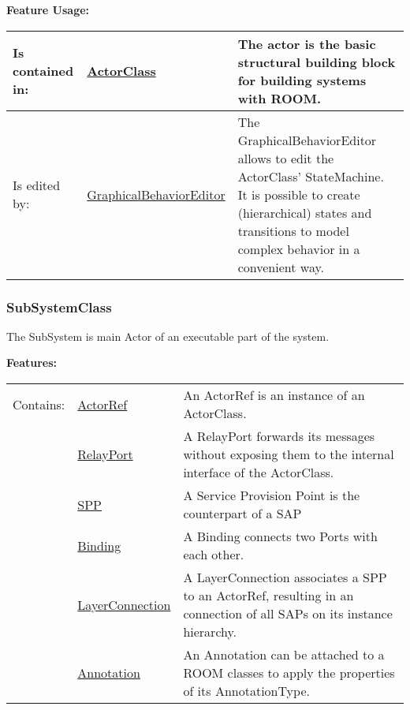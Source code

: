 	\begingroup
	\textbf{Feature Usage:}
	\renewcommand{\arraystretch}{1.8} %
	\begin{longtable}{l|l p{}}
		\hline
	Is contained in: & \tabitem \hyperlink{ref:ActorClass}{ActorClass}  & The actor is the basic structural building block for building systems with ROOM.\\
	\hline
	Is edited by: & \tabitem \hyperlink{ref:GraphicalBehaviorEditor}{GraphicalBehaviorEditor}  & The GraphicalBehaviorEditor allows to edit the ActorClass' StateMachine. It is possible to create (hierarchical) states and transitions to model complex behavior in a convenient way.\\
	\hline
	\end{longtable}
	\endgroup
		
	
	\vspace{\baselineskip}
	\vspace{\baselineskip}
	\vspace{\baselineskip}
	
\subsubsection{SubSystemClass}
	\hypertarget{ref:SubSystemClass}{}
	The SubSystem is main Actor of an executable part of the system. 
		
	
		
		
	\begingroup
	\textbf{Features:}
	\renewcommand{\arraystretch}{1.8} %
	\begin{longtable}{l|l p{}}
		\hline
	Contains: & \tabitem \hyperlink{ref:ActorRef}{ActorRef}  & An ActorRef is an instance of an ActorClass.\\
	& \tabitem \hyperlink{ref:RelayPort}{RelayPort}  & A RelayPort forwards its messages without exposing them to the internal interface of the ActorClass. \\
	& \tabitem \hyperlink{ref:SPP}{SPP}  & A Service Provision Point is the counterpart of a SAP \\
	& \tabitem \hyperlink{ref:Binding}{Binding}  & A Binding connects two Ports with each other. \\
	& \tabitem \hyperlink{ref:LayerConnection}{LayerConnection}  & A LayerConnection associates a SPP to an ActorRef, resulting in an connection of all SAPs on its instance hierarchy. \\
	& \tabitem \hyperlink{ref:Annotation}{Annotation}  & An Annotation can be attached to a ROOM classes to apply the properties of its AnnotationType. \\
	\hline
	\end{longtable}
	\endgroup
		
